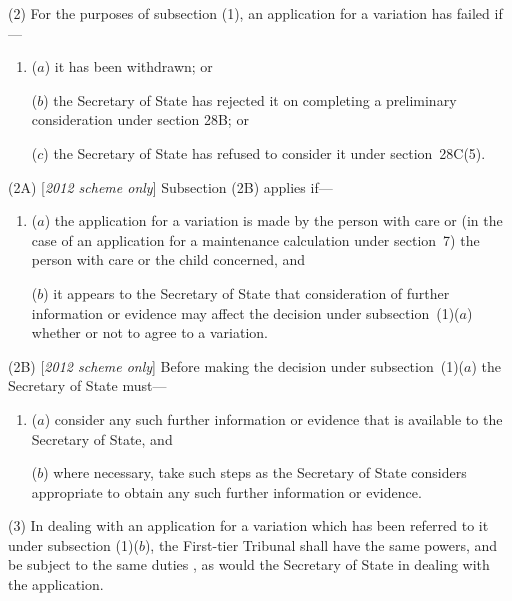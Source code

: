 \documentclass[12pt,a4paper]{article}
\begin{document}
(2) For the purposes of subsection (1), 
an application for a variation  %
has failed if—
\begin{enumerate}\item[]
($a$) it has 
been withdrawn; or

($b$) the 
Secretary of State  %
has rejected it on completing a preliminary consideration under section 28B;
or  %

\begin{sloppypar}
($c$) the 
Secretary of State  %
has refused to consider it under section~28C(5).
\end{sloppypar}
\end{enumerate}

(2A) [\emph{2012 scheme only}] Subsection (2B) applies if—
\begin{enumerate}\item[]
($a$) the application for a variation is made by the person with care or (in the case of an application for a maintenance calculation under section~7) the person with care or the child concerned, and

($b$) it appears to the Secretary of State that consideration of further information or evidence may affect the decision under subsection~(1)($a$) whether or not to agree to a variation.
\end{enumerate}

(2B) [\emph{2012 scheme only}] Before making the decision under subsection~(1)($a$) the Secretary of State must—
\begin{enumerate}\item[]
($a$) consider any such further information or evidence that is available to the Secretary of State, and

($b$) where necessary, take such steps as the Secretary of State considers appropriate to obtain any such further information or evidence.
\end{enumerate}

(3) In dealing with 
an application for a variation  %
which has been referred to it under subsection (1)($b$), 
the First-tier Tribunal  %
shall have the same powers, and be subject to the same duties%
, as would the 
Secretary of State in  %
dealing with the application.
\end{document}
